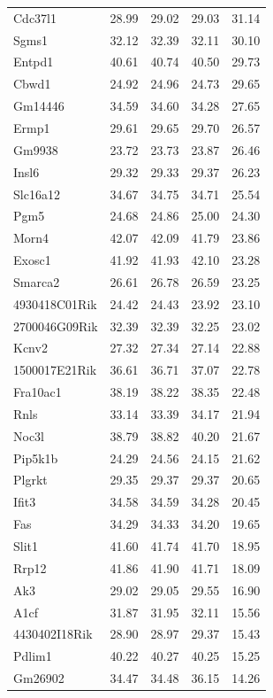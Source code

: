 \documentclass[oneside]{book}\usepackage[]{graphicx}\usepackage[]{color}
\begin{document}
{\begin{longtable}{lrrrr}
  Cdc37l1 & 28.99 & 29.02 & 29.03 & 31.14 \\
  Sgms1 & 32.12 & 32.39 & 32.11 & 30.10 \\
  Entpd1 & 40.61 & 40.74 & 40.50 & 29.73 \\
  Cbwd1 & 24.92 & 24.96 & 24.73 & 29.65 \\
  Gm14446 & 34.59 & 34.60 & 34.28 & 27.65 \\
  Ermp1 & 29.61 & 29.65 & 29.70 & 26.57 \\
  Gm9938 & 23.72 & 23.73 & 23.87 & 26.46 \\
  Insl6 & 29.32 & 29.33 & 29.37 & 26.23 \\
  Slc16a12 & 34.67 & 34.75 & 34.71 & 25.54 \\
  Pgm5 & 24.68 & 24.86 & 25.00 & 24.30 \\
  Morn4 & 42.07 & 42.09 & 41.79 & 23.86 \\
  Exosc1 & 41.92 & 41.93 & 42.10 & 23.28 \\
  Smarca2 & 26.61 & 26.78 & 26.59 & 23.25 \\
  4930418C01Rik & 24.42 & 24.43 & 23.92 & 23.10 \\
  2700046G09Rik & 32.39 & 32.39 & 32.25 & 23.02 \\
  Kcnv2 & 27.32 & 27.34 & 27.14 & 22.88 \\
  1500017E21Rik & 36.61 & 36.71 & 37.07 & 22.78 \\
  Fra10ac1 & 38.19 & 38.22 & 38.35 & 22.48 \\
  Rnls & 33.14 & 33.39 & 34.17 & 21.94 \\
  Noc3l & 38.79 & 38.82 & 40.20 & 21.67 \\
  Pip5k1b & 24.29 & 24.56 & 24.15 & 21.62 \\
  Plgrkt & 29.35 & 29.37 & 29.37 & 20.65 \\
  Ifit3 & 34.58 & 34.59 & 34.28 & 20.45 \\
  Fas & 34.29 & 34.33 & 34.20 & 19.65 \\
  Slit1 & 41.60 & 41.74 & 41.70 & 18.95 \\
  Rrp12 & 41.86 & 41.90 & 41.71 & 18.09 \\
  Ak3 & 29.02 & 29.05 & 29.55 & 16.90 \\
  A1cf & 31.87 & 31.95 & 32.11 & 15.56 \\
  4430402I18Rik & 28.90 & 28.97 & 29.37 & 15.43 \\
  Pdlim1 & 40.22 & 40.27 & 40.25 & 15.25 \\
  Gm26902 & 34.47 & 34.48 & 36.15 & 14.26 \\

\end{longtable}}
\end{document}

